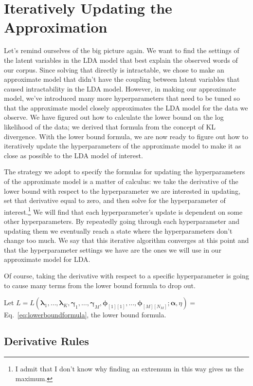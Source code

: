 \documentclass[12pt]{article}
\begin{document}
\section{Iteratively Updating the Approximation}

Let's remind ourselves of the big picture again.  We want to find the settings
of the latent variables in the LDA model that best explain the observed words of
our corpus.  Since solving that directly is intractable, we chose to make an
approximate model that didn't have the coupling between latent variables that
caused intractability in the LDA model.  However, in making our approximate
model, we've introduced many more hyperparameters that need to be tuned so that
the approximate model closely approximates the LDA model for the data we
observe.  We have figured out how to calculate the lower bound on the log
likelihood of the data; we derived that formula from the concept of KL
divergence.  With the lower bound formula, we are now ready to figure out how to
iteratively update the hyperparameters of the approximate model to make it as
close as possible to the LDA model of interest.

The strategy we adopt to specify the formulas for updating the hyperparameters
of the approximate model is a matter of calculus:  we take the derivative of the
lower bound with respect to the hyperparameter we are interested in updating,
set that derivative equal to zero, and then solve for the hyperparameter of
interest.\footnote{I admit that I don't know why finding an extremum in this way
gives us the maximum.}  We will find that each hyperparameter's update is
dependent on some other hyperparameters.  By repeatedly going through each
hyperparameter and updating them we eventually reach a state where the
hyperparameters don't change too much.  We say that this iterative algorithm
converges at this point and that the hyperparameter settings we have are the
ones we will use in our approximate model for LDA.

Of course, taking the derivative with respect to a specific hyperparameter is
going to cause many terms from the lower bound formula to drop out.

Let $L = L(\bm{\lambda}_{1}, \ldots, \bm{\lambda}_{K}, \bm{\gamma}_{1}, \ldots,
\bm{\gamma}_{M}, \bm{\phi}_{[1][1]}, \ldots, \bm{\phi}_{[M][N_{M}]};
\bm{\alpha}, \eta) = $ Eq.~\ref{eq:lowerboundformula}, the lower bound formula.

\subsection{Derivative Rules}
\end{document}
